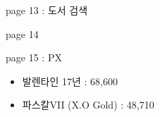 \documentclass[aspectratio=1610,17pt,xcolor=pdftex,dvipsnames,table,handout]{beamer}
\begin{document}
		\begin{frame} [t,plain]

			\begin{block} { page 13  :  도서 검색 }

			\end{block}			
								
		\end{frame}	 %



		\begin{frame} [t,plain]

			\begin{block} { page 14 }

			\end{block}			
								
		\end{frame}	 %


		\begin{frame} [t,plain]

			\begin{block} { page 15 : PX }

			\begin{itemize}
			\item 	발렌타인 17년 : 68,600
			\item 	파스칼VII (X.O Gold) : 48,710
			\end{itemize}



			\end{block}			
								
		\end{frame}	 %
\end{document}
